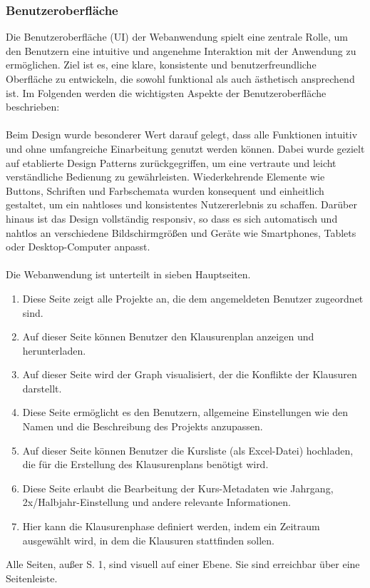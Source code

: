 \subsubsection{Benutzeroberfläche}
Die Benutzeroberfläche (UI) der Webanwendung spielt eine zentrale Rolle, um den Benutzern eine intuitive und angenehme Interaktion mit der Anwendung zu ermöglichen. Ziel ist es, eine klare, konsistente und benutzerfreundliche Oberfläche zu entwickeln, die sowohl funktional als auch ästhetisch ansprechend ist. Im Folgenden werden die wichtigsten Aspekte der Benutzeroberfläche beschrieben:\\\\
Beim Design wurde besonderer Wert darauf gelegt, dass alle Funktionen intuitiv und ohne umfangreiche Einarbeitung genutzt werden können. Dabei wurde gezielt auf etablierte Design Patterns zurückgegriffen, um eine vertraute und leicht verständliche Bedienung zu gewährleisten. Wiederkehrende Elemente wie Buttons, Schriften und Farbschemata wurden konsequent und einheitlich gestaltet, um ein nahtloses und konsistentes Nutzererlebnis zu schaffen. Darüber hinaus ist das Design vollständig responsiv, so dass es sich automatisch und nahtlos an verschiedene Bildschirmgrößen und Geräte wie Smartphones, Tablets oder Desktop-Computer anpasst.\\\\
Die Webanwendung ist unterteilt in sieben Hauptseiten. 
\begin{enumerate}
    \item Diese Seite zeigt alle Projekte an, die dem angemeldeten Benutzer zugeordnet sind.
    \item Auf dieser Seite können Benutzer den Klausurenplan anzeigen und herunterladen.
    \item Auf dieser Seite wird der Graph visualisiert, der die Konflikte der Klausuren darstellt.
    \item Diese Seite ermöglicht es den Benutzern, allgemeine Einstellungen wie den Namen und die Beschreibung des Projekts anzupassen.
    \item Auf dieser Seite können Benutzer die Kursliste (als Excel-Datei) hochladen, die für die Erstellung des Klausurenplans benötigt wird.
    \item Diese Seite erlaubt die Bearbeitung der Kurs-Metadaten wie Jahrgang, 2x/Halbjahr-Einstellung und andere relevante Informationen.
    \item Hier kann die Klausurenphase definiert werden, indem ein Zeitraum ausgewählt wird, in dem die Klausuren stattfinden sollen.
\end{enumerate}
Alle Seiten, außer \acrshort{S.} 1, sind visuell auf einer Ebene. Sie sind erreichbar über eine Seitenleiste. 

